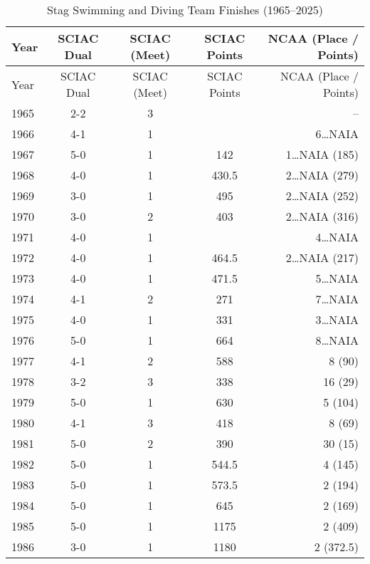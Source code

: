    \clearpage
    \begin{longtable}{lcccr}
        \caption{Stag Swimming and Diving Team Finishes (1965–2025)} \\
        \toprule
        Year & SCIAC Dual & SCIAC (Meet) & SCIAC Points & NCAA (Place / Points) \\
        \midrule
        \endfirsthead
    
        \toprule
        Year & SCIAC Dual & SCIAC (Meet) & SCIAC Points & NCAA (Place / Points) \\
        \midrule
        \endhead

        \bottomrule
        \endfoot
    

        1965 & 2-2 & 3 &   & -- \\
        1966 & 4-1 & 1 &   & 6\ldots NAIA \\
        1967 & 5-0 & 1 & 142 & 1\ldots NAIA (185) \\
        1968 & 4-0 & 1 & 430.5 & 2\ldots NAIA (279) \\
        1969 & 3-0 & 1 & 495 & 2\ldots NAIA (252) \\
        1970 & 3-0 & 2 & 403 & 2\ldots NAIA (316) \\
        1971 & 4-0 & 1 &   & 4\ldots NAIA \\
        1972 & 4-0 & 1 & 464.5 & 2\ldots NAIA (217) \\
        1973 & 4-0 & 1 & 471.5 & 5\ldots NAIA \\
        1974 & 4-1 & 2 & 271 & 7\ldots NAIA \\
        1975 & 4-0 & 1 & 331 & 3\ldots NAIA \\
        1976 & 5-0 & 1 & 664 & 8\ldots NAIA \\
        1977 & 4-1 & 2 & 588 & 8 (90) \\
        1978 & 3-2 & 3 & 338 & 16 (29) \\
        1979 & 5-0 & 1 & 630 & 5 (104) \\
        1980 & 4-1 & 3 & 418 & 8 (69) \\
        1981 & 5-0 & 2 & 390 & 30 (15) \\
        1982 & 5-0 & 1 & 544.5 & 4 (145) \\
        1983 & 5-0 & 1 & 573.5 & 2 (194) \\
        1984 & 5-0 & 1 & 645 & 2 (169) \\
        1985 & 5-0 & 1 & 1175 & 2 (409) \\
        1986 & 3-0 & 1 & 1180 & 2 (372.5) \\

\end{longtable}

